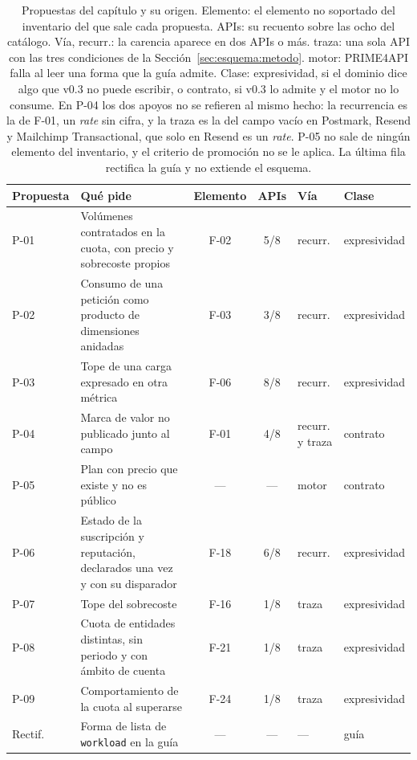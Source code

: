 \begin{table}[tbp]
\centering
\small
\setlength{\tabcolsep}{3pt}
\begin{tabular}{|l|>{\raggedright\arraybackslash}p{}|c|c|l|l|}
\hline
\textbf{Propuesta} & \textbf{Qué pide} & \textbf{Elemento} & \textbf{APIs} & \textbf{Vía} & \textbf{Clase} \\
\hline
P-01 & Volúmenes contratados en la cuota, con precio y sobrecoste propios & F-02 & 5/8 & recurr. & expresividad \\
\hline
P-02 & Consumo de una petición como producto de dimensiones anidadas & F-03 & 3/8 & recurr. & expresividad \\
\hline
P-03 & Tope de una carga expresado en otra métrica & F-06 & 8/8 & recurr. & expresividad \\
\hline
P-04 & Marca de valor no publicado junto al campo & F-01 & 4/8 & recurr. y traza & contrato \\
\hline
P-05 & Plan con precio que existe y no es público & --- & --- & motor & contrato \\
\hline
P-06 & Estado de la suscripción y reputación, declarados una vez y con su disparador & F-18 & 6/8 & recurr. & expresividad \\
\hline
P-07 & Tope del sobrecoste & F-16 & 1/8 & traza & expresividad \\
\hline
P-08 & Cuota de entidades distintas, sin periodo y con ámbito de cuenta & F-21 & 1/8 & traza & expresividad \\
\hline
P-09 & Comportamiento de la cuota al superarse & F-24 & 1/8 & traza & expresividad \\
\hline
Rectif. & Forma de lista de \texttt{workload} en la guía & --- & --- & --- & guía \\
\hline
\end{tabular}
\caption[Propuestas del capítulo y su origen]{Propuestas del capítulo y su origen. Elemento: el elemento no soportado del inventario del que sale cada propuesta. APIs: su recuento sobre las ocho del catálogo. Vía, recurr.: la carencia aparece en dos APIs o más. traza: una sola API con las tres condiciones de la Sección~\ref{sec:esquema:metodo}. motor: PRIME4API falla al leer una forma que la guía admite. Clase: expresividad, si el dominio dice algo que v0.3 no puede escribir, o contrato, si v0.3 lo admite y el motor no lo consume. En P-04 los dos apoyos no se refieren al mismo hecho: la recurrencia es la de F-01, un \textit{rate} sin cifra, y la traza es la del campo vacío en Postmark, Resend y Mailchimp Transactional, que solo en Resend es un \textit{rate}. P-05 no sale de ningún elemento del inventario, y el criterio de promoción no se le aplica. La última fila rectifica la guía y no extiende el esquema.}
\label{tab:propuestas}
\end{table}

